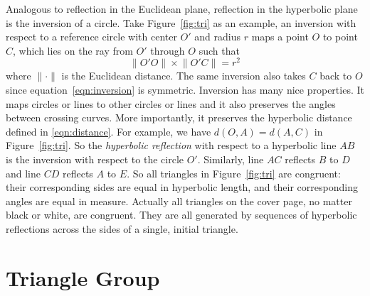 \documentclass[12pt]{article}
\begin{document}
Analogous to reflection in the Euclidean plane, reflection in the
hyperbolic plane is the inversion of a circle. Take
Figure~\ref{fig:tri} as an example, an inversion with respect to a
reference circle with center $O'$ and radius $r$ maps a point $O$ to
point $C$, which lies on the ray from $O'$ through $O$ such that
\begin{equation}\label{eqn:inversion}
  \lVert O'O \rVert \times \lVert O'C \rVert= r^2
\end{equation}
where $\lVert \cdot \rVert$ is the Euclidean distance. The same
inversion also takes $C$ back to $O$ since
equation~\eqref{eqn:inversion} is symmetric. Inversion has many nice
properties. It maps circles or lines to other circles or lines and it
also preserves the angles between crossing curves. More importantly,
it preserves the hyperbolic distance defined in
\eqref{eqn:distance}. For example, we have $d(O, A)=d(A, C)$ in
Figure~\ref{fig:tri}. So the \emph{hyperbolic reflection} with respect
to a hyperbolic line $AB$ is the inversion with respect to the circle
$O'$. Similarly, line $AC$ reflects $B$ to $D$ and line $CD$ reflects
$A$ to $E$. So all triangles in Figure~\ref{fig:tri} are congruent:
their corresponding sides are equal in hyperbolic length, and their
corresponding angles are equal in measure. Actually all triangles on
the cover page, no matter black or white, are congruent. They are all
generated by sequences of hyperbolic reflections across the sides of a
single, initial triangle.

\section{Triangle Group}
\end{document}
